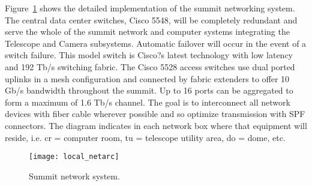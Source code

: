 Figure~\ref{fig:local_netarc} shows the detailed implementation of the summit networking system. The 
central data center switches, Cisco 5548, will be completely redundant and serve the whole of the 
summit network and computer systems integrating the Telescope and Camera subsystems. 
Automatic failover will occur in the event of a switch failure. This model switch is Cisco?s latest 
technology with low latency and 192 Tb/s switching fabric. The Cisco 5528 access switches use dual
ported uplinks in a mesh configuration and connected by fabric extenders to offer 10 Gb/s bandwidth 
throughout the summit. Up to 16 ports can be aggregated to form a maximum of 1.6 Tb/s channel. 
The goal is to interconnect all network devices with fiber cable wherever possible and so optimize 
transmission with SPF connectors. The diagram indicates in each network box where that equipment 
will reside, i.e. cr = computer room, tu = telescope utility area, do = dome, etc.


\begin{figure}
\begin{center}
\texttt{[image: local\_netarc]}
\caption{Summit network system. \label{fig:local_netarc}}
\end{center}
\end{figure}

